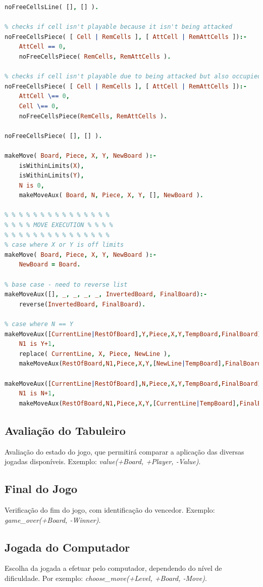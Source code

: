 \documentclass[a4paper]{article}
\begin{document}
\begin{small}
\begin{lstlisting}[language=Prolog]
noFreeCellsLine( [], [] ).

% checks if cell isn't playable because it isn't being attacked
noFreeCellsPiece( [ Cell | RemCells ], [ AttCell | RemAttCells ]):-
	AttCell == 0,
	noFreeCellsPiece( RemCells, RemAttCells ).

% checks if cell isn't playable due to being attacked but also occupied
noFreeCellsPiece( [ Cell | RemCells ], [ AttCell | RemAttCells ]):-
	AttCell \== 0,
	Cell \== 0,
	noFreeCellsPiece(RemCells, RemAttCells ).

noFreeCellsPiece( [], [] ).

makeMove( Board, Piece, X, Y, NewBoard ):-
	isWithinLimits(X),
	isWithinLimits(Y),
	N is 0,
	makeMoveAux( Board, N, Piece, X, Y, [], NewBoard ).

% % % % % % % % % % % % % % %
% % % % MOVE EXECUTION % % % %
% % % % % % % % % % % % % % %
% case where X or Y is off limits
makeMove( Board, Piece, X, Y, NewBoard ):-
	NewBoard = Board.

% base case - need to reverse list
makeMoveAux([], _, _, _, _, InvertedBoard, FinalBoard):-
	reverse(InvertedBoard, FinalBoard).

% case where N == Y
makeMoveAux([CurrentLine|RestOfBoard],Y,Piece,X,Y,TempBoard,FinalBoard):-
	N1 is Y+1,
	replace( CurrentLine, X, Piece, NewLine ),
	makeMoveAux(RestOfBoard,N1,Piece,X,Y,[NewLine|TempBoard],FinalBoard).

makeMoveAux([CurrentLine|RestOfBoard],N,Piece,X,Y,TempBoard,FinalBoard):-
	N1 is N+1,
	makeMoveAux(RestOfBoard,N1,Piece,X,Y,[CurrentLine|TempBoard],FinalBoard).
\end{lstlisting}
\end{small}

\subsection{Avaliação do Tabuleiro} Avaliação do estado do jogo, que permitirá comparar a aplicação das diversas jogadas disponíveis. Exemplo: \textit{value(+Board, +Player, -Value)}.

\subsection{Final do Jogo} Verificação do fim do jogo, com identificação do vencedor. Exemplo: \textit{game\_over(+Board, -Winner)}.

\subsection{Jogada do Computador} Escolha da jogada a efetuar pelo computador, dependendo do nível de dificuldade. Por exemplo: \textit{choose\_move(+Level, +Board, -Move)}.
\end{document}
